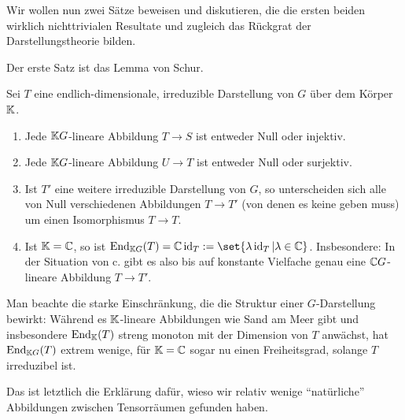 \begin{remark}
Wir wollen nun zwei Sätze beweisen und diskutieren, die die ersten beiden wirklich nichttrivialen Resultate und zugleich das Rückgrat der Darstellungstheorie bilden.

Der erste Satz ist das Lemma von Schur.
\end{remark}

\begin{theorem}\label{darstellungen:schur}
Sei $T$ eine endlich-dimensionale, irreduzible Darstellung von $G$ über dem Körper $\mathbb{K}$.
\begin{enumerate}
\item Jede $\mathbb{K} G$-lineare Abbildung $T\to S$ ist entweder Null oder injektiv.
\item Jede $\mathbb{K} G$-lineare Abbildung $U\to T$ ist entweder Null oder surjektiv.
\item Ist $T'$ eine weitere irreduzible Darstellung von $G$, so unterscheiden sich alle von Null verschiedenen Abbildungen $T\to T'$ (von denen es keine geben muss) um einen Isomorphismus $T\to T$.
\item Ist $\mathbb{K}=\mathbb{C}$, so ist $\End_{\IK G}(T) = \IC\id_T := \set{\lambda\id_T | \lambda\in\IC}$. Insbesondere: In der Situation von c. gibt es also bis auf konstante Vielfache genau eine $\mathbb{C} G$-lineare Abbildung $T\to T'$.
\end{enumerate}
\end{theorem}

\begin{remark}
Man beachte die starke Einschränkung, die die Struktur einer $G$-Darstellung bewirkt: Während es $\mathbb{K}$-lineare Abbildungen wie Sand am Meer gibt und insbesondere $\operatorname{End}_{\mathbb{K}}(T)$ streng monoton mit der Dimension von $T$ anwächst, hat $\operatorname{End}_{\mathbb{K} G}(T)$ extrem wenige, für $\mathbb{K}=\mathbb{C}$ sogar nu einen Freiheitsgrad, solange $T$ irreduzibel ist.

Das ist letztlich die Erklärung dafür, wieso wir relativ wenige \enquote{natürliche} Abbildungen zwischen Tensorräumen gefunden haben.
\end{remark}


